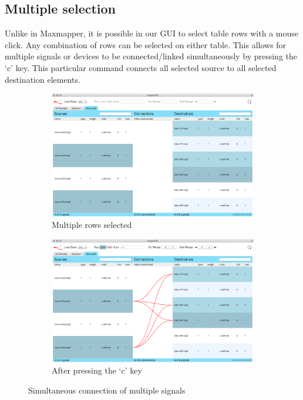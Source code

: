 	\subsection{Multiple selection} %
	\label{sub:multiple_selection}

Unlike in Maxmapper, it is possible in our GUI to select table rows with a mouse click. Any combination of rows can be selected on either table. This allows for multiple signals or devices to be connected/linked simultaneously by pressing the `c' key. This particular command connects all selected source to all selected destination elements. 

\begin{figure}
	\centering
	\begin{subfigure}[]{0.49\textwidth}
		\centering
		\includegraphics[width=\textwidth]{figures/multi-select_before_connect}
		\caption{Multiple rows selected}
		\label{fig:multiple_connect_before}
	\end{subfigure}
	\begin{subfigure}[]{0.49\textwidth}
		\centering
		\includegraphics[width=\textwidth]{figures/multi-select_after_connect}
		\caption{After pressing the `c' key}
		\label{fig:multiple_connect_after}
	\end{subfigure}
	\caption{Simultaneous connection of multiple signals}\label{fig:multiple_connect}
\end{figure}

